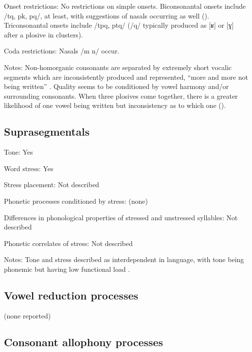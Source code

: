{\begin{appendixdesc}
\item[Onset restrictions:] No restrictions on simple onsets. Biconsonantal onsets include /tq, pk, pq/, at least, with suggestions of nasals occurring as well (\citeyear[9]{Whitehead2004}). Triconsonantal onsets include /tpq, ptq/ (/q/ typically produced as [ʁ] or [ɣ] after a plosive in clusters). 

\item[Coda restrictions:] Nasals /m n/ occur.

\item[Notes:] Non-homorganic consonants are separated by extremely short vocalic segments which are inconsistently produced and represented, “more and more not being written” \citep[226]{Whitehead2004}. Quality seems to be conditioned by vowel harmony and/or surrounding consonants. When three plosives come together, there is a greater likelihood of one vowel being written but inconsistency as to which one (\citeyear[9]{Whitehead2004}).
\end{appendixdesc}
\subsection*{Suprasegmentals}
\begin{appendixdesc}
\item[Tone:] Yes

\item[Word stress:] Yes

\item[Stress placement:] Not described

\item[Phonetic processes conditioned by stress:] (none)

\item[Differences in phonological properties of stressed and unstressed syllables:] Not described

\item[Phonetic correlates of stress:] Not described

\item[Notes:] Tone and stress described as interdependent in language, with tone being phonemic but having low functional load \citep[226]{Whitehead2004}. 
\end{appendixdesc}
\subsection*{Vowel reduction processes}

(none reported)
\subsection*{Consonant allophony processes}
\begin{appendixdesc}


\end{appendixdesc}}
